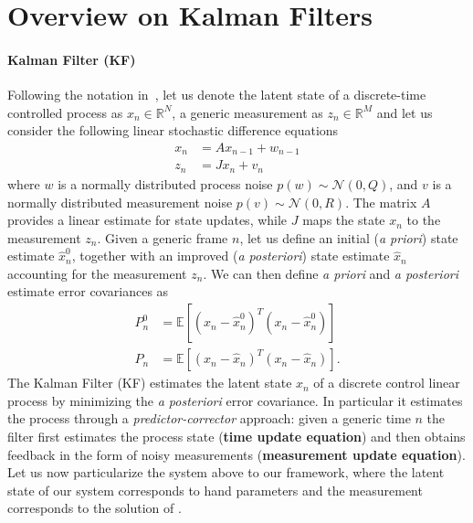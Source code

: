\section{Overview on Kalman Filters}
%
\paragraph{Kalman Filter (KF)} 
Following the notation in~\cite{welch1995introduction}, let us denote the latent state of a discrete-time controlled process as $x_n \in \mathbb{R}^N$, a generic measurement as $z_n \in \mathbb{R}^M$ and let us consider the following linear stochastic difference equations
% 
\begin{align}
x_n &= A x_{n - 1} +  w_{n - 1} \\
z_n &= J x_n + v_n
\end{align}
% 
where $w$ is a normally distributed process noise $p(w) \sim \mathcal{N}(0, Q)$, and $v$ is a normally distributed measurement noise $p(v) \sim \mathcal{N}(0, R)$. The matrix $A$ provides a linear estimate for state updates, while $J$ maps the state $x_n$ to the measurement $z_n$.
Given a generic frame $n$, let us define an initial (\textit{a priori}) state estimate $\hat{x}_n^0$, together with an improved (\textit{a posteriori}) state estimate $\hat{x}_n$ accounting for the measurement $z_n$. 
We can then define \textit{a priori} and \textit{a posteriori} estimate error covariances as
% 
\begin{align}
	P_n^0 &= \mathbb{E}[(x_n - \hat{x}_n^0)^T(x_n - \hat{x}_n^0)]\\
	P_n   &= \mathbb{E}[(x_n - \hat{x}_n)^T(x_n - \hat{x}_n)].
\end{align}
%
The Kalman Filter (KF) estimates the latent state $x_n$ of a discrete control linear process by minimizing the \textit{a posteriori} error covariance. In particular it estimates the process through a \textit{predictor-corrector} approach: given a generic time $n$ the filter first estimates the process state (\textbf{time update equation}) and then obtains feedback in the form of noisy measurements (\textbf{measurement update equation}).
Let us now particularize the system above to our framework, where the latent state of our system corresponds to hand parameters and the measurement corresponds to the solution of .
